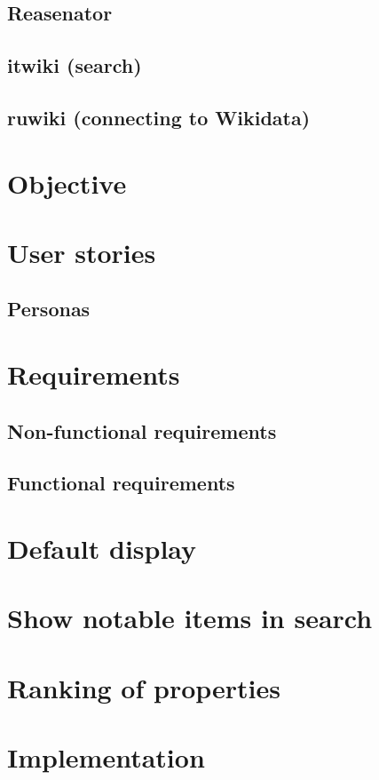 \documentclass[11pt]{article}
\begin{document}
  \subsection{Reasenator}
  \subsection{itwiki (search)}
  \subsection{ruwiki (connecting to Wikidata)}

  \section{Objective}

  \section{User stories}
  \subsection{Personas}

  \section{Requirements} 
  \subsection{Non-functional requirements}
  \subsection{Functional requirements}

  \section {Default display}

  \section {Show notable items in search}

  \section {Ranking of properties}

  \section{Implementation}
\end{document}
